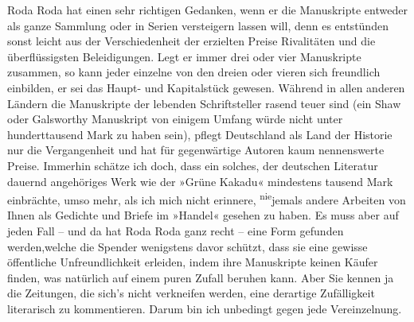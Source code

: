 \pstart
           Roda Roda hat einen sehr richtigen Gedanken,
               wenn er die Manuskripte entweder als ganze Sammlung oder in Serien versteigern lassen
               will, denn es entstünden sonst leicht aus der Verschiedenheit der erzielten Preise
               Rivalitäten und die überflüssigsten Beleidigungen. Legt er immer drei oder vier
               Manuskripte zusammen, so kann jeder einzelne von den dreien oder vieren sich
               freundlich einbilden, er sei das Haupt- und Kapitalstück gewesen. Während in allen
               anderen Ländern die Manuskripte der lebenden Schriftsteller rasend teuer sind (ein
                  Shaw oder Galsworthy Manuskript von einigem Umfang würde nicht unter hunderttausend
               Mark zu haben sein), pflegt Deutschland als Land
               der Historie nur die Vergangenheit und hat für gegenwärtige Autoren kaum nennenswerte
               Preise. Immerhin schätze ich doch, dass ein solches, der deutschen Literatur dauernd angehöriges Werk wie der »Grüne Kakadu« mindestens  tausend Mark einbrächte, umso mehr, als ich mich
               nicht erinnere, \substVorne{}\textsuperscript{nie}\substDazwischen{}je\substHinten{}mals andere Arbeiten von Ihnen als Gedichte und Briefe im »Handel« gesehen zu
               haben. Es muss aber auf jeden Fall – und da hat Roda
                  Roda ganz recht – eine Form gefunden werden,{\pb}welche die Spender wenigstens davor
               schützt, dass sie eine gewisse öffentliche Unfreundlichkeit erleiden, indem ihre
               Manuskripte keinen Käufer finden, was natürlich auf einem puren Zufall beruhen kann.
               Aber Sie kennen ja die Zeitungen, die sich's nicht verkneifen werden, eine derartige
               Zufälligkeit literarisch zu kommentieren. Darum bin ich unbedingt gegen jede
               Vereinzelnung.\pend
           
